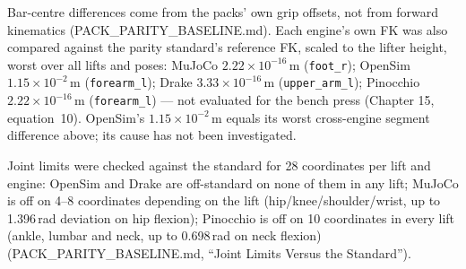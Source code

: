 \documentclass[11pt,a4paper]{article}
\begin{document}
\begin{table}[h]
\centering\small
{}
\caption{Worst pairwise same-input difference (m) over all engine pairs and
poses, pelvis-relative, against the 0.02\,m cross-engine position tolerance
(PACK\_PARITY\_BASELINE.md, ``Same-Input Cross-Engine Parity''). Segment,
hand and foot parity hold within tolerance for every lift (worst 0.0115\,m,
OpenSim vs.\ Drake at the flexion pose); bar-centre and lifter-CoM
differences exceed it everywhere. The bench-press mass spread (30\,kg) is the
bench-mass convention gap, not a body-segment discrepancy.}
\end{table}

Bar-centre differences come from the packs' own grip offsets, not from
forward kinematics (PACK\_PARITY\_BASELINE.md). Each engine's own FK was also
compared against the parity standard's reference FK, scaled to the lifter
height, worst over all lifts and poses: MuJoCo $2.22\times10^{-16}$\,m
(\texttt{foot\_r}); OpenSim $1.15\times10^{-2}$\,m (\texttt{forearm\_l});
Drake $3.33\times10^{-16}$\,m (\texttt{upper\_arm\_l}); Pinocchio
$2.22\times10^{-16}$\,m (\texttt{forearm\_l}) --- not evaluated for the bench
press (Chapter 15, equation~10). OpenSim's $1.15\times10^{-2}$\,m equals its
worst cross-engine segment difference above; its cause has not been
investigated.

Joint limits were checked against the standard for 28 coordinates per lift
and engine: OpenSim and Drake are off-standard on none of them in any lift;
MuJoCo is off on 4--8 coordinates depending on the lift (hip/knee/shoulder/wrist,
up to 1.396\,rad deviation on hip flexion); Pinocchio is off on 10
coordinates in every lift (ankle, lumbar and neck, up to 0.698\,rad on neck
flexion) (PACK\_PARITY\_BASELINE.md, ``Joint Limits Versus the Standard'').
\end{document}
